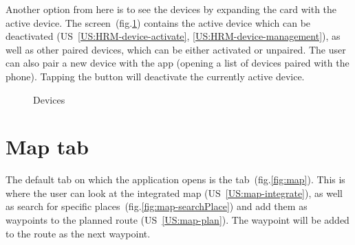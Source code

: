 Another option from here is to see the devices by expanding the card with the active device.
The  screen~(fig.\ref{fig:devices}) contains the active device which can be deactivated (US~\ref{US:HRM-device-activate}, \ref{US:HRM-device-management}), as well as other paired devices, which can be either activated or unpaired.
The user can also pair a new device with the app (opening a list of devices paired with the phone).
Tapping the  button will deactivate the currently active device.

\begin{figure}[h!]
    \centering
    \hfill
    \caption{Devices}
    \label{fig:devices}
\end{figure}

\section{Map tab}
The default tab on which the application opens is the  tab~(fig.\ref{fig:map}).
This is where the user can look at the integrated map (US~\ref{US:map-integrate}), as well as search for specific places~(fig.\ref{fig:map-searchPlace}) and add them as waypoints to the planned route (US~\ref{US:map-plan}).
The waypoint will be added to the route as the next waypoint.

